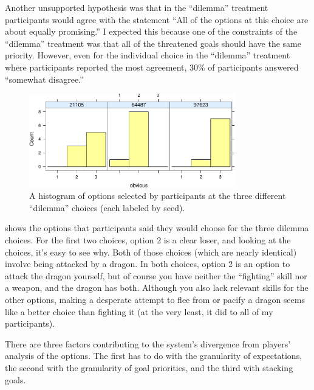 Another unsupported hypothesis was that in the ``dilemma'' treatment participants would agree with the statement ``All of the options at this choice are about equally promising.''
%
I expected this because one of the constraints of the ``dilemma'' treatment was that all of the threatened goals should have the same priority.
%
However, even for the individual choice in the ``dilemma'' treatment where participants reported the most agreement, 30\% of participants answered ``somewhat disagree.'' 


\begin{figure}[!h]
  \centering
  \includegraphics[width=0.8\textwidth,page=3]{fig/choices-cropped.pdf}
  \caption[Histogram of option preferences for ``dilemma'' choices]{A histogram of options selected by participants at the three different ``dilemma'' choices (each labeled by seed).}
  \label{fig:s1-dilchoices}
\end{figure}


 shows the options that participants said they would choose for the three dilemma choices.
%
For the first two choices, option 2 is a clear loser, and looking at the choices, it's easy to see why.
%
Both of those choices (which are nearly identical) involve being attacked by a dragon.
%
In both choices, option 2 is an option to attack the dragon yourself, but of course you have neither the ``fighting'' skill nor a weapon, and the dragon has both.
%
Although you also lack relevant skills for the other options, making a desperate attempt to flee from or pacify a dragon seems like a better choice than fighting it (at the very least, it did to all of my participants).


There are three factors contributing to the system's divergence from players' analysis of the options.
%
The first has to do with the granularity of expectations, the second with the granularity of goal priorities, and the third with stacking goals.


